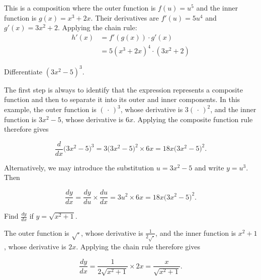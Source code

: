 \begin{solution}
This is a composition where the outer function is \( f(u) = u^5 \) and the inner function is \( g(x) = x^3 + 2x \). Their derivatives are \( f'(u) = 5u^4 \) and \( g'(x) = 3x^2 + 2 \).
Applying the chain rule:
\[
\begin{aligned}
h'(x) &= f'(g(x)) \cdot g'(x) \\
&= 5(x^3 + 2x)^4 \cdot (3x^2 + 2)
\end{aligned}
\]
\end{solution}

\begin{example}

    Differentiate \(\left(3 x^2-5\right)^3\).
\end{example}

\begin{solution}
    The first step is always to identify that the expression represents a composite function and then to separate it into its outer and inner components. In this example, the outer function is $(\,\cdot\,)^{3}$, whose derivative is $3(\,\cdot\,)^{2}$, and the inner function is $3x^{2}-5$, whose derivative is $6x$. Applying the composite function rule therefore gives

    \[
    \frac{d}{dx}\big(3x^{2}-5\big)^{3}
    = 3\big(3x^{2}-5\big)^{2} \times 6x
    = 18x\big(3x^{2}-5\big)^{2}.
    \]
    
    Alternatively, we may introduce the substitution \(u = 3x^{2}-5\) and write \(y = u^{3}\). Then
    
    \[
    \frac{dy}{dx}
    = \frac{dy}{du} \times \frac{du}{dx}
    = 3u^{2} \times 6x
    = 18x\big(3x^{2}-5\big)^{2}.
    \]
    
\end{solution}

\begin{example}

    Find \(\frac{d y}{d x}\) if \(y=\sqrt{x^2+1}\).

\end{example}
\begin{solution}
    The outer function is \(\sqrt{\cdot}\), whose derivative is \(\frac{1}{2\sqrt{\cdot}}\), and the inner function is \(x^2+1\), whose derivative is \(2x\). Applying the chain rule therefore gives

    \[
    \frac{d y}{d x} = \frac{1}{2\sqrt{x^2+1}} \times 2x = \frac{x}{\sqrt{x^2+1}}.
    \]
\end{solution}

